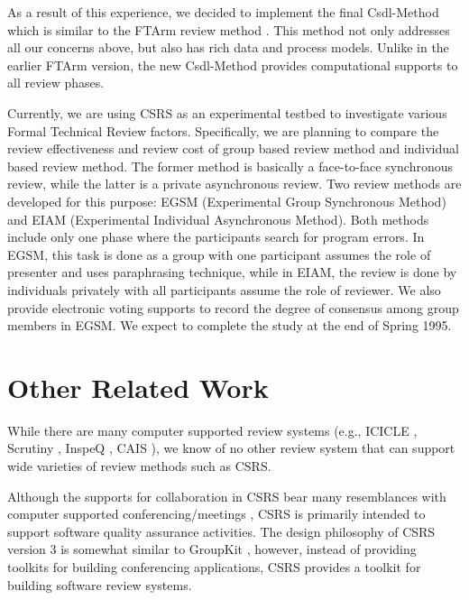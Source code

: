 As a result of this experience, we decided
to implement the final Csdl-Method which is similar to
the FTArm review method \cite{Johnson93,CSDL-93-17}.
This method not only addresses all our concerns above, but also
has rich data and process models. Unlike in the earlier FTArm version,
the new Csdl-Method provides computational supports to all
review phases. 

Currently, we are using CSRS as an experimental testbed to investigate
various Formal Technical Review factors. 
Specifically, we are planning to compare the review effectiveness and
review cost of group based review method and individual based review
method. The former method is basically a face-to-face synchronous
review, while the latter is a private asynchronous review.
Two review methods are developed for this purpose: EGSM (Experimental
Group Synchronous Method) and EIAM (Experimental Individual
Asynchronous Method). Both methods include only one phase where the 
participants search for program errors. In EGSM, this task is done as
a group with one participant assumes the role of presenter and uses
paraphrasing technique, while  in EIAM, the review is done by
individuals privately with all participants assume the role of reviewer.
We also provide electronic voting supports to record the degree of
consensus among group members in EGSM.
We expect to complete the study at the end of Spring 1995.


\section {Other Related Work}
While there are many computer supported review systems (e.g., 
ICICLE \cite{Brothers90}, Scrutiny \cite{Gintell93},
InspeQ \cite{Knight93}, CAIS \cite{Mashayekhi94}), 
we know of no other review system that can support wide varieties of 
review methods such as CSRS.

Although the supports for collaboration in CSRS bear many resemblances
with computer supported conferencing/meetings \cite{Nunamaker91}, CSRS
is primarily intended to support software quality assurance
activities.  The design philosophy of CSRS version 3 is somewhat
similar to GroupKit \cite{Roseman92}, however, instead of providing
toolkits for building conferencing applications, CSRS provides a
toolkit for building software review systems.


